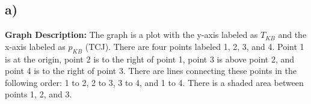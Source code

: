

\subsection*{a)}

\textbf{Graph Description:} The graph is a plot with the y-axis labeled as \( T_{KB} \) and the x-axis labeled as \( p_{KB} \) (TCJ). There are four points labeled 1, 2, 3, and 4. Point 1 is at the origin, point 2 is to the right of point 1, point 3 is above point 2, and point 4 is to the right of point 3. There are lines connecting these points in the following order: 1 to 2, 2 to 3, 3 to 4, and 1 to 4. There is a shaded area between points 1, 2, and 3.
